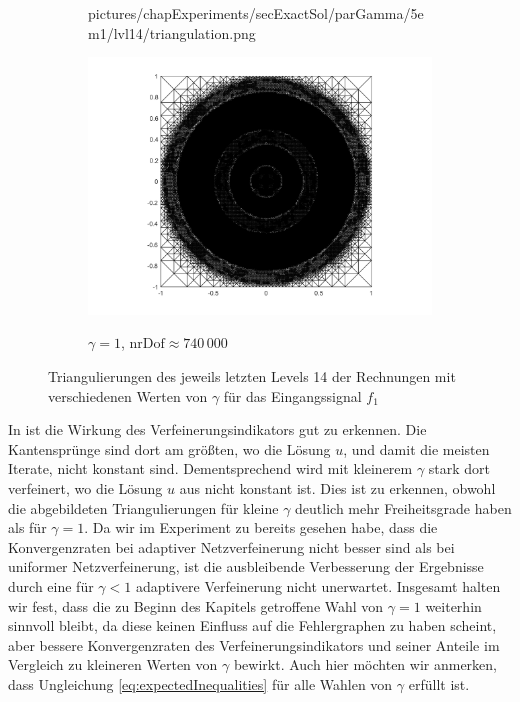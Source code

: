 \begin{figure}[p]
\begin{subfigure}{.32\linewidth}
      {pictures/chapExperiments/secExactSol/parGamma/5em1/lvl14/triangulation.png}
    \label{fig:gammaDot5Triang}
  \end{subfigure}
  \begin{subfigure}{.32\linewidth}
    \centering
    \caption{$\gamma=1$, $\text{nrDof}\approx 740\,000$}
    \includegraphics[trim = 100 30 80 20, clip, width=\linewidth]
      {pictures/chapExperiments/secExactSol/parGamma/1/lvl14/triangulation.png}
    \label{fig:gamma1Triang}
  \end{subfigure}
  \caption{Triangulierungen des jeweils letzten Levels 14 der Rechnungen mit
    verschiedenen Werten von $\gamma$ für das Eingangssignal $f_1$}
  \label{fig:gammaTriangs}
\end{figure}
In  ist die Wirkung des Verfeinerungsindikators gut zu
erkennen. 
Die Kantensprünge sind dort am größten, wo die Lösung $u$, und damit die
meisten Iterate, nicht konstant sind.   
Dementsprechend wird mit kleinerem $\gamma$ stark dort verfeinert, wo die Lösung
$u$ aus  nicht konstant ist.
Dies ist zu erkennen, obwohl die abgebildeten Triangulierungen für kleine
$\gamma$ deutlich mehr Freiheitsgrade haben als für $\gamma=1$.
Da wir im Experiment zu  bereits gesehen habe, dass
die Konvergenzraten bei adaptiver Netzverfeinerung nicht besser sind als bei
uniformer Netzverfeinerung, ist die ausbleibende Verbesserung der Ergebnisse
durch eine für $\gamma<1$ adaptivere Verfeinerung nicht unerwartet.
Insgesamt halten wir fest, dass die zu Beginn des Kapitels getroffene Wahl
von $\gamma=1$ weiterhin sinnvoll bleibt, da diese keinen Einfluss
auf die Fehlergraphen zu haben scheint, aber bessere Konvergenzraten
des Verfeinerungsindikators und seiner Anteile im Vergleich zu kleineren
Werten von $\gamma$ bewirkt.
Auch hier möchten wir anmerken, dass Ungleichung
\eqref{eq:expectedInequalities} für alle Wahlen von $\gamma$ erfüllt ist.

